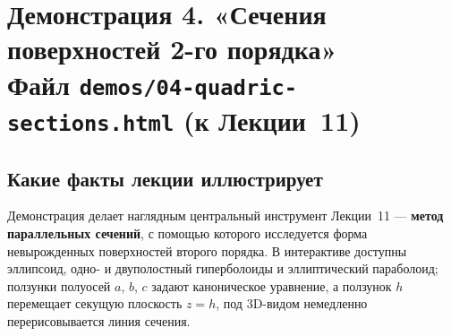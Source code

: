 \section*{Демонстрация 4. «Сечения поверхностей 2-го порядка»\\ \normalsize\textmd{Файл \texttt{demos/04-quadric-sections.html} \quad(к Лекции~11)}}

\subsection*{Какие факты лекции иллюстрирует}

Демонстрация делает наглядным центральный инструмент Лекции~11 ---
\textbf{метод параллельных сечений}, с помощью которого исследуется
форма невырожденных поверхностей второго порядка. В интерактиве
доступны эллипсоид, одно- и двуполостный гиперболоиды и эллиптический
параболоид; ползунки полуосей $a$, $b$, $c$ задают каноническое
уравнение, а ползунок $h$ перемещает секущую плоскость $z = h$, под
3D-видом немедленно перерисовывается линия сечения.

